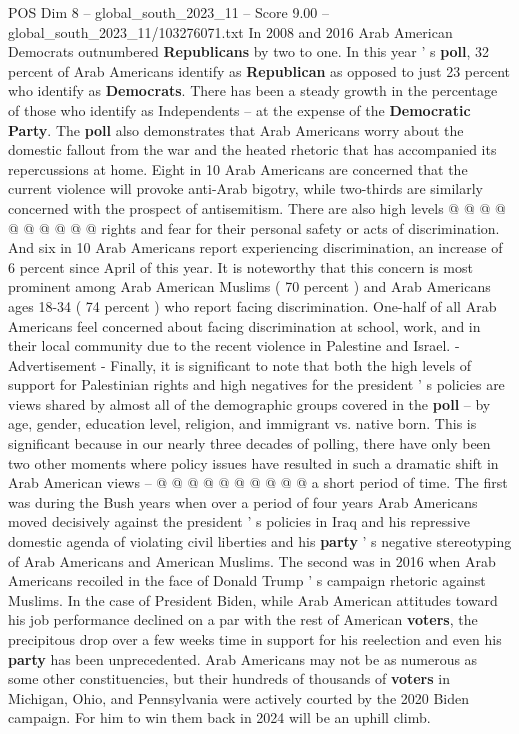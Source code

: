\begin{textsample}{POS Dim 8 – global\_south\_2023\_11 – Score 9.00 – global\_south\_2023\_11/103276071.txt}
In 2008 and 2016 Arab American Democrats outnumbered \textbf{Republicans} by two to one.
In this year ' s \textbf{poll}, 32 percent of Arab Americans identify as \textbf{Republican} as opposed to just 23 percent who identify as \textbf{Democrats}.
There has been a steady growth in the percentage of those who identify as Independents -- at the expense of the \textbf{Democratic} \textbf{Party}.
The \textbf{poll} also demonstrates that Arab Americans worry about the domestic fallout from the war and the heated rhetoric that has accompanied its repercussions at home.
Eight in 10 Arab Americans are concerned that the current violence will provoke anti-Arab bigotry, while two-thirds are similarly concerned with the prospect of antisemitism.
There are also high levels @ @ @ @ @ @ @ @ @ @ rights and fear for their personal safety or acts of discrimination.
And six in 10 Arab Americans report experiencing discrimination, an increase of 6 percent since April of this year.
It is noteworthy that this concern is most prominent among Arab American Muslims ( 70 percent ) and Arab Americans ages 18-34 ( 74 percent ) who report facing discrimination.
One-half of all Arab Americans feel concerned about facing discrimination at school, work, and in their local community due to the recent violence in Palestine and Israel. - Advertisement - Finally, it is significant to note that both the high levels of support for Palestinian rights and high negatives for the president ' s policies are views shared by almost all of the demographic groups covered in the \textbf{poll} -- by age, gender, education level, religion, and immigrant vs. native born.
This is significant because in our nearly three decades of polling, there have only been two other moments where policy issues have resulted in such a dramatic shift in Arab American views -- @ @ @ @ @ @ @ @ @ @ a short period of time.
The first was during the Bush years when over a period of four years Arab Americans moved decisively against the president ' s policies in Iraq and his repressive domestic agenda of violating civil liberties and his \textbf{party} ' s negative stereotyping of Arab Americans and American Muslims.
The second was in 2016 when Arab Americans recoiled in the face of Donald Trump ' s campaign rhetoric against Muslims.
In the case of President Biden, while Arab American attitudes toward his job performance declined on a par with the rest of American \textbf{voters}, the precipitous drop over a few weeks time in support for his reelection and even his \textbf{party} has been unprecedented.
Arab Americans may not be as numerous as some other constituencies, but their hundreds of thousands of \textbf{voters} in Michigan, Ohio, and Pennsylvania were actively courted by the 2020 Biden campaign.
For him to win them back in 2024 will be an uphill climb.

\end{textsample}
